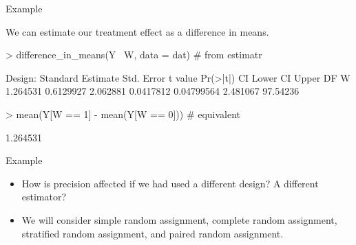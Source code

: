 \documentclass[xcolor={dvipsnames},handout]{beamer}
\begin{document}
\begin{frame}[fragile]{Example}

We can estimate our treatment effect as a difference in means.

\scriptsize
\begin{Schunk}
\begin{Sinput}
> difference_in_means(Y ~W, data = dat) # from estimatr
\end{Sinput}
\begin{Soutput}
Design:  Standard
  Estimate Std. Error  t value  Pr(>|t|)   CI Lower CI Upper       DF
W 1.264531  0.6129927 2.062881 0.0417812 0.04799564 2.481067 97.54236
\end{Soutput}
\end{Schunk}


\begin{Schunk}
\begin{Sinput}
> mean(Y[W == 1] - mean(Y[W == 0])) # equivalent
\end{Sinput}
\begin{Soutput}
[1] 1.264531
\end{Soutput}
\end{Schunk}


\end{frame}



\begin{frame}{Example}

\begin{itemize}
\item How is precision affected if we had used a different design?  A different estimator?
\item We will consider simple random assignment, complete random assignment, stratified random assignment, and paired random assignment.
\end{itemize}

\end{frame}


\end{document}
